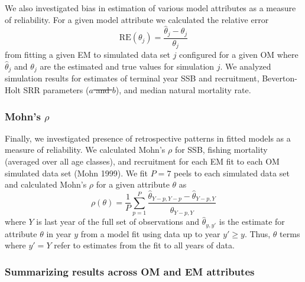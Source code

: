 \documentclass[
  12pt,
]{article}
\makeatletter
\providecommand{\DIFadd}[1]{{\protect\color{blue}\uwave{#1}}} %
\providecommand{\DIFdel}[1]{{\protect\color{red}\sout{#1}}} %
\providecommand{\DIFaddbegin}{} %
\providecommand{\DIFaddend}{} %
\providecommand{\DIFdelbegin}{} %
\providecommand{\DIFdelend}{} %
\providecommand{\DIFscaledelfig}{0.5}
\newlength{\DIFdelgraphicswidth} %
\newlength{\DIFdelgraphicsheight} %
\providecommand{\DIFaddincludegraphics}[2][]{{\color{blue}\fbox{\DIFOincludegraphics[#1]{#2}}}} %
\providecommand{\DIFdelincludegraphics}[2][]{%
\sbox{\DIFdelgraphicsbox}{\DIFOincludegraphics[#1]{#2}}%
\settoboxwidth{\DIFdelgraphicswidth}{\DIFdelgraphicsbox} %
\settoboxtotalheight{\DIFdelgraphicsheight}{\DIFdelgraphicsbox} %
\scalebox{\DIFscaledelfig}{%
\parbox[b]{\DIFdelgraphicswidth}{\usebox{\DIFdelgraphicsbox}\\[-\baselineskip] \rule{\DIFdelgraphicswidth}{0em}}\llap{\resizebox{\DIFdelgraphicswidth}{\DIFdelgraphicsheight}{%
\setlength{\unitlength}{\DIFdelgraphicswidth}%
\begin{picture}(1,1)%
\thicklines\linethickness{2pt} %
{\color[rgb]{1,0,0}\put(0,0){\framebox(1,1){}}}%
{\color[rgb]{1,0,0}\put(0,0){\line( 1,1){1}}}%
{\color[rgb]{1,0,0}\put(0,1){\line(1,-1){1}}}%
\end{picture}%
}\hspace*{3pt}}} %
} %
\DeclareRobustCommand{\DIFaddbegin}{\DIFOaddbegin \let\includegraphics\DIFaddincludegraphics} %
\DeclareRobustCommand{\DIFaddend}{\DIFOaddend \let\includegraphics\DIFOincludegraphics} %
\DeclareRobustCommand{\DIFdelbegin}{\DIFOdelbegin \let\includegraphics\DIFdelincludegraphics} %
\DeclareRobustCommand{\DIFdelend}{\DIFOaddend \let\includegraphics\DIFOincludegraphics} %
\let\sout@orig\sout %
\renewcommand{\sout}[1]{\ifmmode\text{\sout@orig{\ensuremath{#1}}}\else\sout@orig{#1}\fi} %
\makeatother
\begin{document}
We also investigated bias in estimation of various model attributes as a
measure of reliability. For a given model attribute we calculated the
relative error \begin{equation}\label{relerror}
\text{RE}\left(\theta_j\right) = \frac{\widehat \theta_j - \theta_j}{\theta_j}
\end{equation} from fitting a given EM to simulated data set \(j\)
configured for a given OM where \(\widehat \theta_j\) and \(\theta_j\)
are the estimated and true values for simulation \(j\). We analyzed
simulation results for estimates of terminal year SSB and recruitment,
Beverton-Holt SRR parameters (\DIFdelbegin \DIFdel{\(a\) and \(b\)}\DIFdelend \DIFaddbegin \DIFadd{\(\alpha\) and \(\beta\)}\DIFaddend ), and median
natural mortality rate.

\subsubsection*{\texorpdfstring{Mohn's
\(\rho\)}{Mohn's \textbackslash rho}}\label{mohns-rho}

Finally, we investigated presence of retrospective patterns in fitted
models as a measure of reliability. We calculated Mohn's \(\rho\) for
SSB, fishing mortality (averaged over all age classes), and recruitment
for each EM fit to each OM simulated data set (Mohn 1999). We fit
\(P = 7\) peels to each simulated data set and calculated Mohn's
\(\rho\) for a given attribute \(\theta\) as
\begin{equation}\label{mohns_rho}
\rho\left(\theta\right) = \frac{1}{P}\sum^P_{p=1} \frac{\widehat \theta_{Y-p,Y-p} - \widehat\theta_{Y-p,Y}}{\widehat\theta_{Y-p,Y}}
\end{equation} where \(Y\) is last year of the full set of observations
and \(\widehat \theta_{y,y'}\) is the estimate for attribute \(\theta\)
in year \(y\) from a model fit using data up to year \(y'\geq y\). Thus,
\(\theta\) terms where \(y'=Y\) refer to estimates from the fit to all
years of data.

\subsubsection*{Summarizing results across OM and EM
attributes}\label{summarizing-results-across-om-and-em-attributes}
\end{document}
